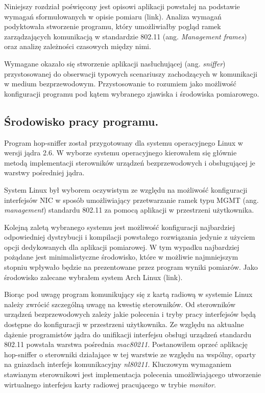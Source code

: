%
 
Niniejszy rozdział poświęcony jest opisowi aplikacji powstałej na podstawie wymagań sformułowanych w opisie pomiaru (link). Analiza wymagań podyktowała stworzenie programu, który umożliwiałby pogląd ramek zarządzających komunikacją w standardzie 802.11 (ang. \emph{Management frames}) oraz analizę zależności czasowych między nimi. 

Wymagane okazało się stworzenie aplikacji nasłuchującej (ang. \emph{sniffer}) przystosowanej do obserwacji typowych scenariuszy zachodzących w komunikacji w medium bezprzewodowym. Przystosowanie to rozumiem jako możliwość konfiguracji programu pod kątem wybranego zjawiska i środowiska pomiarowego. 

\subsection{Środowisko pracy programu.}

Program hop-sniffer został przygotowany dla systemu operacyjnego Linux w wersji jądra 2.6. W wyborze systemu operacyjnego kierowałem się głównie metodą implementacji sterowników urządzeń bezprzewodowych i obsługującej je warstwy pośredniej jądra. 

System Linux był wyborem oczywistym ze względu na możliwość konfiguracji interfejsów NIC w sposób umożliwiający przetwarzanie ramek typu MGMT (ang. \emph{management}) standardu 802.11 za pomocą aplikacji w przestrzeni użytkownika.

Kolejną zaletą wybranego systemu jest możliwość konfiguracji najbardziej odpowiedniej dystrybucji i kompilacji powstałego rozwiązania jedynie z użyciem opcji dedykowanych dla aplikacji pomiarowej. W tym wypadku najbardziej pożądane jest minimalistyczne środowisko, które w możliwie najmniejszym stopniu wpływało będzie na prezentowane przez program wyniki pomiarów. Jako środowisko zalecane wybrałem system Arch Linux (link).

Biorąc pod uwagę program komunikujący się z kartą radiową w systemie Linux należy zwrócić szczególną uwagę na kwestię sterowników. Od sterowników urządzeń bezprzewodowych zależy jakie polecenia i tryby pracy interfejsów będą dostępne do konfiguracji w przestrzeni użytkownika. Ze względu na aktualne dążenie programistów jądra do unifikacji interfejsu obsługi urządzeń standardu 802.11 powstała warstwa pośrednia \emph{mac80211}. Postanowiłem oprzeć aplikację hop-sniffer o sterowniki działające w tej warstwie ze względu na wspólny, oparty na gniazdach interfejs komunikacyjny \emph{nl80211}. Kluczowym wymaganiem stawianym sterownikowi jest implementacja polecenia umożliwiającego utworzenie wirtualnego interfejsu karty radiowej pracującego w trybie \emph{monitor}.

